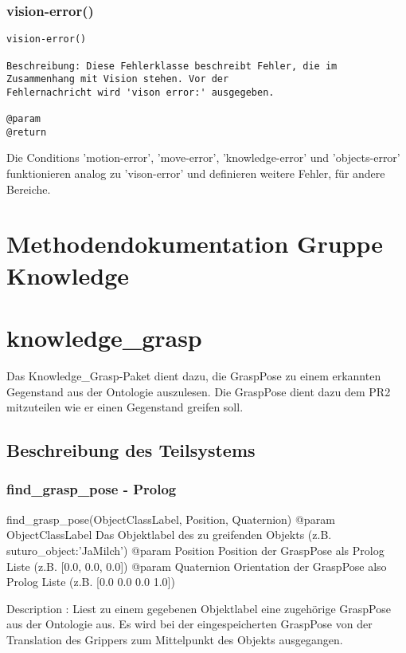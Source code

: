 \documentclass{suturo}
\begin{document}
\subsubsection{vision-error()}
\begin{verbatim}
vision-error()

Beschreibung: Diese Fehlerklasse beschreibt Fehler, die im
Zusammenhang mit Vision stehen. Vor der 
Fehlernachricht wird 'vison error:' ausgegeben. 

@param
@return 
\end{verbatim}

Die Conditions 'motion-error', 'move-error', 'knowledge-error' und 'objects-error' funktionieren analog zu 'vison-error' und definieren weitere Fehler, für andere Bereiche.


\newpage
\section*{Methodendokumentation Gruppe Knowledge}
\section{knowledge\_grasp}
Das Knowledge\_Grasp-Paket dient dazu, die GraspPose zu einem erkannten Gegenstand aus der Ontologie auszulesen. Die GraspPose dient dazu dem PR2 mitzuteilen wie er einen Gegenstand greifen soll.

\begin{figure}[!htb]
\end{figure}
      
\subsection{Beschreibung des Teilsystems}

\subsubsection{find\_grasp\_pose - Prolog}
\begin{spverbatim}
find_grasp_pose(ObjectClassLabel, Position, Quaternion)
@param ObjectClassLabel Das Objektlabel des zu greifenden Objekts 
       (z.B. suturo_object:'JaMilch')
@param Position Position der GraspPose als Prolog Liste (z.B. [0.0, 0.0, 0.0])
@param Quaternion Orientation der GraspPose also Prolog Liste 
       (z.B. [0.0 0.0 0.0 1.0])

Description : Liest zu einem gegebenen Objektlabel eine zugehörige GraspPose 
aus der Ontologie aus. Es wird bei der eingespeicherten GraspPose von der 
Translation des Grippers zum Mittelpunkt des Objekts ausgegangen.
\end{spverbatim}
\end{document}
